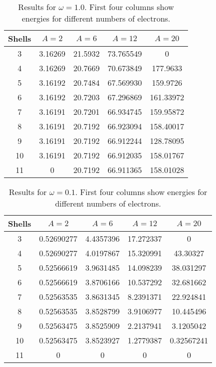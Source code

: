 \documentclass[11pt]{article}
\begin{document}
\begin{table}[H]
	\centering
	\begin{tabular}{c | c | c | c | c }

		Shells 	& $A = 2$	& $A = 6$ 	& $A = 12$ 	& $A = 20$ 	\\ \hline
         3 &    3.16269 &    21.5932 &  73.765549 &          0  \\ 
         4 &    3.16269 &    20.7669 &  70.673849 &   177.9633  \\ 
         5 &    3.16192 &    20.7484 &  67.569930 &   159.9726  \\ 
         6 &    3.16192 &    20.7203 &  67.296869 &  161.33972  \\ 
         7 &    3.16191 &    20.7201 &  66.934745 &  159.95872  \\ 
         8 &    3.16191 &    20.7192 &  66.923094 &  158.40017  \\ 
         9 &    3.16191 &    20.7192 &  66.912244 &  128.78095  \\ 
        10 &    3.16191 &    20.7192 &  66.912035 &  158.01767  \\ 
        11 &          0 &    20.7192 &  66.911365 &  158.01028  \\ 
	\end{tabular}
	\caption{Results for $\omega = 1.0$. First four columns show energies for different numbers of electrons.}
	\label{tab:omega10}
\end{table}

\begin{table}[H]
	\centering
	\begin{tabular}{c | c | c | c | c }

		Shells 	& $A = 2$	& $A = 6$ 	& $A = 12$ 	& $A = 20$ 	\\ \hline
         3 & 0.52690277 &  4.4357396 &  17.272337 &          0  \\ 
         4 & 0.52690277 &  4.0197867 &  15.320991 &   43.30327  \\ 
         5 & 0.52566619 &  3.9631485 &  14.098239 &  38.031297  \\ 
         6 & 0.52566619 &  3.8706166 &  10.537292 &  32.681662  \\ 
         7 & 0.52563535 &  3.8631345 &  8.2391371 &  22.924841  \\ 
         8 & 0.52563535 &  3.8528799 &  3.9106977 &  10.445496  \\ 
         9 & 0.52563475 &  3.8525909 &  2.2137941 &  3.1205042  \\ 
        10 & 0.52563475 &  3.8523927 &  1.2779387 & 0.32567241  \\ 
        11 &          0 &          0 &          0 &          0  \\ 
	\end{tabular}
	\caption{Results for $\omega = 0.1$. First four columns show energies for different numbers of electrons.}
	\label{tab:omega01}
\end{table}
\end{document}
